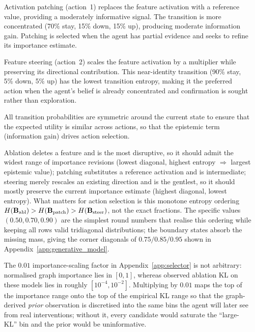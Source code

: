 Activation patching (action~1) replaces the feature
activation with a reference value, providing a moderately
informative signal.  The transition is more concentrated
(70\% stay, 15\% down, 15\% up), producing moderate information
gain.  Patching is selected when the agent has partial evidence
and seeks to refine its importance estimate.

Feature steering (action~2) scales the feature activation
by a multiplier while preserving its directional contribution.
This near-identity transition (90\% stay, 5\% down, 5\% up) has
the lowest transition entropy, making it the preferred action
when the agent's belief is already concentrated and confirmation
is sought rather than exploration.

All transition probabilities are symmetric around the current state
to ensure that the expected utility is similar across actions, so
that the epistemic term (information gain) drives action selection.

 Ablation deletes a
feature and is the most disruptive, so it should admit the widest range of
importance revisions (lowest diagonal, highest entropy $\Rightarrow$ largest
epistemic value); patching substitutes a reference activation and is intermediate;
steering merely rescales an existing direction and is the gentlest, so it should
mostly preserve the current importance estimate (highest diagonal, lowest entropy).
What matters for action selection is this monotone entropy ordering
$H(\mathbf{B}_{\text{abl}}) > H(\mathbf{B}_{\text{patch}}) > H(\mathbf{B}_{\text{steer}})$,
not the exact fractions. The specific values $(0.50,0.70,0.90)$ are the simplest
round numbers that realise this ordering while keeping all rows valid tridiagonal
distributions; the boundary states absorb the missing mass, giving the corner
diagonals of $0.75/0.85/0.95$ shown in
Appendix~\ref{app:generative_model}.

The $0.01$ importance-scaling factor in
Appendix~\ref{app:selector} is not arbitrary: normalised graph importance lies in
$[0,1]$, whereas observed ablation KL on these models lies in roughly
$[10^{-4},10^{-2}]$. Multiplying by $0.01$ maps the top of the importance range onto
the top of the empirical KL range so that the graph-derived \emph{prior} observation
is discretised into the same bins the agent will later see from real interventions;
without it, every candidate would saturate the ``large-KL'' bin and the prior would
be uninformative.

